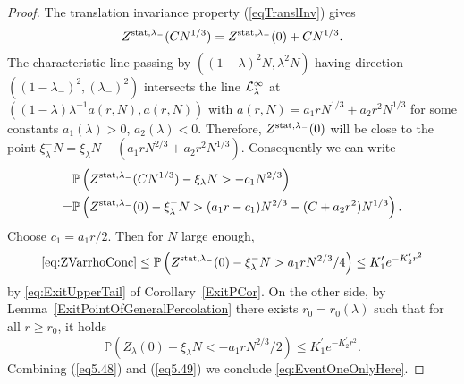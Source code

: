 \documentclass[12pt,a4paper]{article}
\numberwithin{equation}{section}
\newcommand{\Pb}{\mathbb{P}}
\begin{document}
\begin{proof}
The translation invariance property (\ref{eqTranslInv}) gives
\begin{equation}
Z^{{\rm stat},\lambda_{-}}(CN^{1/3}) = Z^{{\rm stat},\lambda_{-}}(0)+CN^{1/3}.
\end{equation}
The characteristic line passing by $((1-\lambda)^2N,\lambda^2 N)$ having direction \mbox{$((1-\lambda_{-})^2, (\lambda_{-})^2)$} intersects the line ${\cal L}^{\infty}_{\lambda}$ at $((1-\lambda)\lambda^{-1} a(r,N),a(r,N))$ with $a(r,N)=a_1rN^{1/3}+a_2 r^2N^{1/3}$ for some constants $a_1(\lambda)>0$, $a_2(\lambda)<0$. Therefore, $Z^{{\rm stat},\lambda_{-}}(0)$ will be close to the point $\xi^{-}_{\lambda}N= \xi_{\lambda}N-(a_1rN^{2/3}+a_2r^2N^{1/3})$. Consequently we can write
\begin{equation}\label{eq:ZVarrhoConc}
\begin{aligned}
&\Pb\left(Z^{{\rm stat},\lambda_{-}}(CN^{1/3})-\xi_{\lambda}N >- c_1N^{2/3}\right)\\=& \Pb\left(Z^{{\rm stat},\lambda_{-}}(0) -\xi^{-}_{\lambda}N>(a_1r-c_1)N^{2/3}-(C+a_2r^2)N^{1/3}\right).
\end{aligned}
\end{equation}
Choose $c_1=a_1r/2$. Then for $N$ large enough,
\begin{equation}\label{eq5.48}
\eqref{eq:ZVarrhoConc}\leq \Pb\left(Z^{{\rm stat},\lambda_{-}}(0)- \xi^{-}_{\lambda}N >a_1rN^{2/3}/4\right)\leq K_1'e^{-K_2'r^{2}}
\end{equation}
by \eqref{eq:ExitUpperTail} of Corollary~\ref{ExitPCor}. On the other side, by Lemma~\ref{ExitPointOfGeneralPercolation} there exists $r_0=r_0(\lambda)$ such that for all $r\geq r_0$, it holds
\begin{equation}\label{eq5.49}
\Pb\left(Z_{\lambda}(0)- \xi_\lambda N<-a_1r N^{2/3}/2\right)\leq K^{\prime}_1e^{-K^{\prime}_2 r^2}.
\end{equation}
Combining (\ref{eq5.48}) and (\ref{eq5.49}) we conclude \eqref{eq:EventOneOnlyHere}.


\end{proof}
\end{document}
